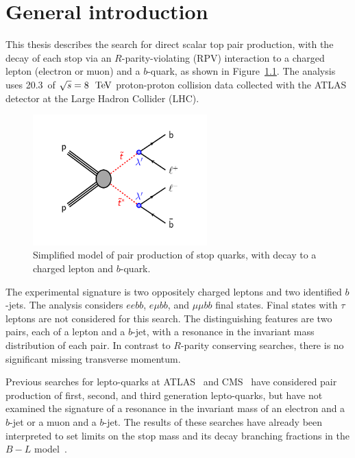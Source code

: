 \chapter[General introduction][General introduction]{General introduction}
\label{ch:intro}

This thesis describes the search for direct scalar top pair production, with
the decay of each stop via an $R$-parity-violating (RPV) interaction to a
charged lepton (electron or muon) and a $b$-quark, as shown in
Figure~\ref{fig:blstop_diagram}.
The analysis uses 20.3~\ifb of $\sqrt{s}=8~\TeV$ proton-proton collision data
collected with the ATLAS detector at the Large Hadron Collider (LHC).

\begin{figure}[ht]
  \centering
  \includegraphics[width=0.60\textwidth]{figs/blstop/b_minus_l_stop_stop.pdf}
  \caption{Simplified model of pair production of stop quarks, with decay to a
    charged lepton and $b$-quark.
  }
  \label{fig:blstop_diagram}
\end{figure}


The experimental signature is two oppositely charged leptons and two identified
$b$-jets.
The analysis considers $eebb$, $e \mu bb$, and $\mu \mu bb$ final states.
Final states with $\tau$ leptons are not considered for this search.
The distinguishing features are two pairs, each of a lepton and a $b$-jet, with
a resonance in the invariant mass distribution of each pair.
In contrast to $R$-parity conserving searches, there is no significant missing
transverse momentum.

Previous searches for lepto-quarks at ATLAS~\cite{ATLAS:2013oea,
ATLAS:2012aq, Aad:2011ch, Aad:2011uv} and
CMS~\cite{Khachatryan:2014ura, CMS:2014qpa, Chatrchyan:2012sv,
Chatrchyan:2012vza} have considered pair production of first, second,
and third generation lepto-quarks, but have not examined the signature
of a resonance in the invariant mass of an electron and a $b$-jet or a
muon and a $b$-jet.  The results of these searches have already been
interpreted to set limits on the stop mass and its decay
branching fractions in the $B-L$
model~\cite{Marshall:2014cwa, Marshall:2014kea}.

